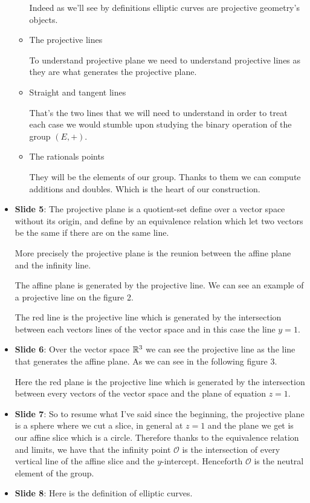 \begin{itemize}
\begin{itemize}
                    Indeed as we'll see by definitions elliptic curves are projective
                    geometry's objects.
                \item The projective lines
                    
                    To understand projective plane we need to understand projective lines as
                    they are what generates the projective plane.
                \item Straight and tangent lines

                    That's the two lines that we will need to understand in order to treat
                    each case we would stumble upon studying the binary operation of the group
                    $\left( E,+ \right) $.
                \item The rationals points

                    They will be the elements of our group. Thanks to them we can compute
                    additions and doubles. Which is the heart of our construction.
            \end{itemize}
        \item \textbf{Slide 5}: The projective plane is a quotient-set define over a
            vector space without its origin, and define by an equivalence relation which let
            two vectors be the same if there are on the same line.

            More precisely the projective plane is the reunion between the affine plane
            and the infinity line.

            The affine plane is generated by the projective line. We can see an example of a
            projective line on the figure 2. 

            The red line is the projective line which is generated by the intersection between
            each vectors lines
            of the vector space and in this case the line $y=1$.
        \item \textbf{Slide 6}: Over the vector space $\mathbb{R}^3$ we can see the
            projective line as the line that generates the affine plane. As we can see in
            the following figure 3. 

            Here the red plane is the projective line which is
            generated by the intersection between every vectors of the vector space and
            the plane of equation $z=1$.
        \item \textbf{Slide 7}: So to resume what I've said since the beginning, the
            projective plane is a sphere where we cut a slice, in general at $z=1$ and
            the plane we get is our affine slice which is a circle. Therefore thanks to the
            equivalence relation and limits, we have that the infinity
            point $\mathcal{O}$ is the intersection of every vertical line of the
            affine slice and the $y$-intercept. Henceforth $\mathcal{O}$ is the neutral
            element of the group.
        \item \textbf{Slide 8}: Here is the definition of elliptic curves.


\end{itemize}
